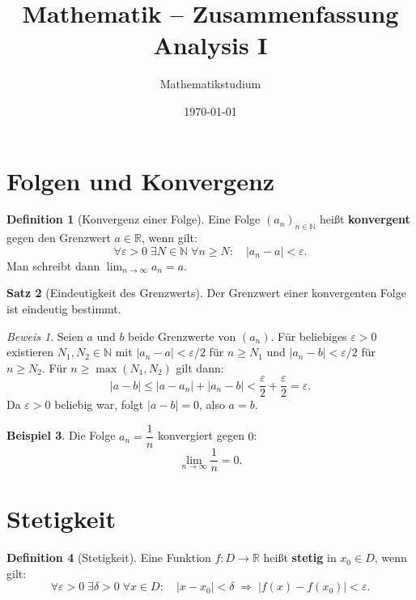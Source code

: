 \documentclass[a4paper,12pt]{article}
\title{Mathematik -- Zusammenfassung\\
       \large Analysis I}
\author{Mathematikstudium}
\date{\today}
\theoremstyle{definition}
\newtheorem{definition}{Definition}[section]
\newtheorem{satz}[definition]{Satz}
\newtheorem{beispiel}[definition]{Beispiel}
\theoremstyle{remark}
\newtheorem{beweis}{Beweis}
\begin{document}
\maketitle
\tableofcontents
\newpage

\section{Folgen und Konvergenz}

\begin{definition}[Konvergenz einer Folge]
Eine Folge $(a_n)_{n \in \mathbb{N}}$ heißt \textbf{konvergent} gegen den
Grenzwert $a \in \mathbb{R}$, wenn gilt:
\[
  \forall \varepsilon > 0 \;\exists N \in \mathbb{N} \;\forall n \geq N:
  \quad |a_n - a| < \varepsilon.
\]
Man schreibt dann $\lim_{n \to \infty} a_n = a$.
\end{definition}

\begin{satz}[Eindeutigkeit des Grenzwerts]
Der Grenzwert einer konvergenten Folge ist eindeutig bestimmt.
\end{satz}

\begin{beweis}
Seien $a$ und $b$ beide Grenzwerte von $(a_n)$. Für beliebiges
$\varepsilon > 0$ existieren $N_1, N_2 \in \mathbb{N}$ mit
$|a_n - a| < \varepsilon/2$ für $n \geq N_1$ und
$|a_n - b| < \varepsilon/2$ für $n \geq N_2$.
Für $n \geq \max(N_1, N_2)$ gilt dann:
\[
  |a - b| \leq |a - a_n| + |a_n - b| < \frac{\varepsilon}{2} +
  \frac{\varepsilon}{2} = \varepsilon.
\]
Da $\varepsilon > 0$ beliebig war, folgt $|a - b| = 0$, also $a = b$.
\end{beweis}

\begin{beispiel}
Die Folge $a_n = \dfrac{1}{n}$ konvergiert gegen $0$:
\[
  \lim_{n \to \infty} \frac{1}{n} = 0.
\]
\end{beispiel}

\section{Stetigkeit}

\begin{definition}[Stetigkeit]
Eine Funktion $f: D \to \mathbb{R}$ heißt \textbf{stetig} in $x_0 \in D$,
wenn gilt:
\[
  \forall \varepsilon > 0 \;\exists \delta > 0 \;\forall x \in D:
  \quad |x - x_0| < \delta \;\Rightarrow\; |f(x) - f(x_0)| < \varepsilon.
\]
\end{definition}
\end{document}
